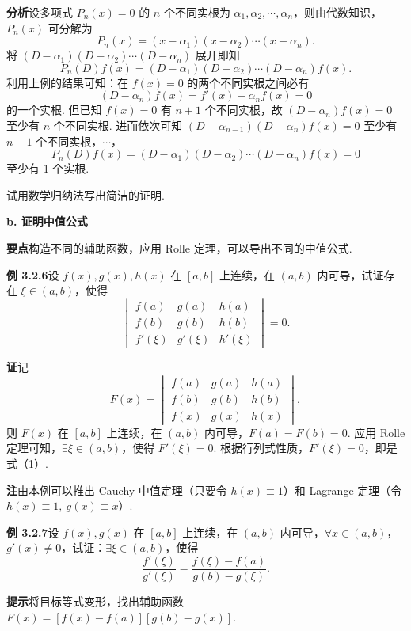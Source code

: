 \documentclass[UTF8, 12pt, fontset=fandol, oneside]{ctexart}
\begin{document}
\noindent\textbf{分析}\quad 设多项式 $P_n(x)=0$ 的 $n$ 个不同实根为 $\alpha_1,\alpha_2,\cdots,\alpha_n$，则由代数知识，$P_n(x)$ 可分解为
\[
  P_n(x)=(x-\alpha_1)(x-\alpha_2)\cdots(x-\alpha_n).
\]
将 $(D-\alpha_1)(D-\alpha_2)\cdots(D-\alpha_n)$ 展开即知
\[
  P_n(D)f(x)=(D-\alpha_1)(D-\alpha_2)\cdots(D-\alpha_n)f(x).
\]
利用上例的结果可知：在 $f(x)=0$ 的两个不同实根之间必有
\[
  (D-\alpha_n)f(x)=f'(x)-\alpha_nf(x)=0
\]
的一个实根. 但已知 $f(x)=0$ 有 $n+1$ 个不同实根，故 $(D-\alpha_n)f(x)=0$ 至少有 $n$ 个不同实根. 进而依次可知 $(D-\alpha_{n-1})(D-\alpha_n)f(x)=0$ 至少有 $n-1$ 个不同实根，$\cdots$，
\[
  P_n(D)f(x)=(D-\alpha_1)(D-\alpha_2)\cdots(D-\alpha_n)f(x)=0
\]
至少有 1 个实根.

试用数学归纳法写出简洁的证明.

\noindent\textbf{b. 证明中值公式}

\noindent\textbf{要点}\quad 构造不同的辅助函数，应用 Rolle 定理，可以导出不同的中值公式.

\noindent\textbf{例 3.2.6}\quad 设 $f(x),g(x),h(x)$ 在 $[a,b]$ 上连续，在 $(a,b)$ 内可导，试证存在 $\xi\in(a,b)$，使得
\begin{equation}
  \begin{vmatrix}
  f(a)&g(a)&h(a)\\
  f(b)&g(b)&h(b)\\
  f'(\xi)&g'(\xi)&h'(\xi)
  \end{vmatrix}=0.
\tag{1}
\end{equation}

\noindent\textbf{证}\quad 记
\[
  F(x)=
  \begin{vmatrix}
  f(a)&g(a)&h(a)\\
  f(b)&g(b)&h(b)\\
  f(x)&g(x)&h(x)
  \end{vmatrix},
\]
则 $F(x)$ 在 $[a,b]$ 上连续，在 $(a,b)$ 内可导，$F(a)=F(b)=0$. 应用 Rolle 定理可知，$\exists\xi\in(a,b)$，使得 $F'(\xi)=0$. 根据行列式性质，$F'(\xi)=0$，即是式（1）.

\noindent\textbf{注}\quad 由本例可以推出 Cauchy 中值定理（只要令 $h(x)\equiv1$）和 Lagrange 定理（令 $h(x)\equiv1,\ g(x)\equiv x$）.

\noindent\textbf{例 3.2.7}\quad 设 $f(x),g(x)$ 在 $[a,b]$ 上连续，在 $(a,b)$ 内可导，$\forall x\in(a,b)$，$g'(x)\ne0$，试证：$\exists\xi\in(a,b)$，使得
\[
  \frac{f'(\xi)}{g'(\xi)}=\frac{f(\xi)-f(a)}{g(b)-g(\xi)}.
\]

\noindent\textbf{提示}\quad 将目标等式变形，找出辅助函数 $F(x)=[f(x)-f(a)][g(b)-g(x)]$.
\end{document}
